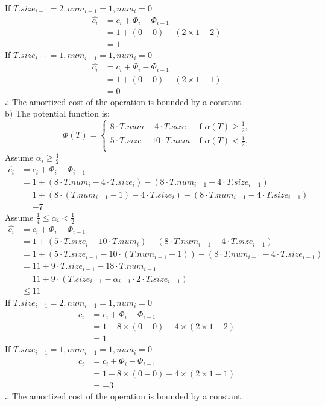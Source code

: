 \documentclass[12pt,letterpaper]{article}
\begin{document}
If $T.size_{i-1} = 2, num_{i-1} = 1, num_{i} = 0$
\begin{align*}
\widehat{c_i} &= c_i + \Phi_{i} - \Phi_{i-1} \\
&= 1 + (0 - 0) - (2 \times 1 - 2) \\
&= 1
\end{align*}
If $T.size_{i-1} = 1, num_{i-1} = 1, num_{i} = 0$
\begin{align*}
\widehat{c_i} &= c_i + \Phi_{i} - \Phi_{i-1} \\
&= 1 + (0 - 0) - (2 \times 1 - 1) \\
&= 0
\end{align*}
$\therefore$ The amortized cost of the operation is bounded by a constant. \\
b) The potential function is:
\begin{equation}
    \Phi(T)=
   \begin{cases}
   8 \cdot T.num - 4 \cdot T.size &\mbox{if $\alpha(T) \ge \frac{1}{2}$,}\\
   5 \cdot T.size - 10 \cdot T.num &\mbox{if $\alpha(T) < \frac{1}{2}$.}\\
   \end{cases}
\end{equation}
Assume $\alpha_{i} \ge \frac{1}{2}$
\begin{align*}
\widehat{c_i} &= c_i + \Phi_{i} - \Phi_{i-1} \\
&= 1 + ( 8 \cdot T.num_{i} - 4 \cdot T.size_{i} ) - ( 8 \cdot T.num_{i-1} - 4 \cdot T.size_{i-1} ) \\
&= 1 + ( 8 \cdot (T.num_{i-1} - 1) - 4 \cdot T.size_{i} ) - ( 8 \cdot T.num_{i-1} - 4 \cdot T.size_{i-1} ) \\
&= -7
\end{align*}
Assume $\frac{1}{4} \le \alpha_{i} < \frac{1}{2}$
\begin{align*}
\widehat{c_i} &= c_i + \Phi_{i} - \Phi_{i-1} \\
&= 1 + ( 5 \cdot T.size_{i}  - 10 \cdot T.num_{i} ) - ( 8 \cdot T.num_{i-1} - 4 \cdot T.size_{i-1} ) \\
&= 1 + ( 5 \cdot T.size_{i-1} - 10 \cdot (T.num_{i-1} - 1)) - ( 8 \cdot T.num_{i-1} - 4 \cdot T.size_{i-1} ) \\
&= 11 + 9 \cdot T.size_{i-1} - 18 \cdot T.num_{i-1} \\
&= 11 + 9 \cdot (T.size_{i-1} - \alpha_{i-1} \cdot 2 \cdot T.size_{i-1}) \\
&\le 11
\end{align*}
If $T.size_{i-1} = 2, num_{i-1} = 1, num_{i} = 0$
\begin{align*}
\widehat{c_i} &= c_i + \Phi_{i} - \Phi_{i-1} \\
&= 1 + 8 \times (0 - 0) - 4 \times (2 \times 1 - 2) \\
&= 1
\end{align*}
If $T.size_{i-1} = 1, num_{i-1} = 1, num_{i} = 0$
\begin{align*}
\widehat{c_i} &= c_i + \Phi_{i} - \Phi_{i-1} \\
&= 1 + 8 \times (0 - 0) - 4 \times (2 \times 1 - 1) \\
&= -3
\end{align*}
$\therefore$ The amortized cost of the operation is bounded by a constant.
\end{document}
